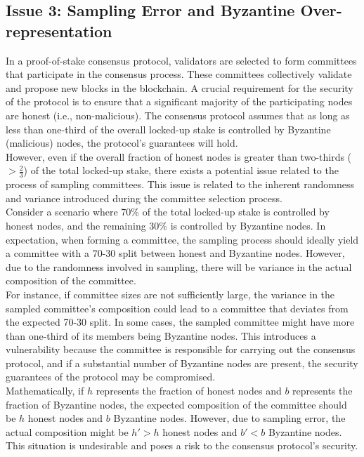 \subsection{Issue 3: Sampling Error and Byzantine Over-representation}
In a proof-of-stake consensus protocol, validators are selected to form committees that participate in the consensus process. These committees collectively validate and propose new blocks in the blockchain. A crucial requirement for the security of the protocol is to ensure that a significant majority of the participating nodes are honest (i.e., non-malicious). The consensus protocol assumes that as long as less than one-third of the overall locked-up stake is controlled by Byzantine (malicious) nodes, the protocol's guarantees will hold.\\
However, even if the overall fraction of honest nodes is greater than two-thirds (\(>\frac{2}{3}\)) of the total locked-up stake, there exists a potential issue related to the process of sampling committees. This issue is related to the inherent randomness and variance introduced during the committee selection process.\\
Consider a scenario where 70\% of the total locked-up stake is controlled by honest nodes, and the remaining 30\% is controlled by Byzantine nodes. In expectation, when forming a committee, the sampling process should ideally yield a committee with a 70-30 split between honest and Byzantine nodes. However, due to the randomness involved in sampling, there will be variance in the actual composition of the committee.\\
For instance, if committee sizes are not sufficiently large, the variance in the sampled committee's composition could lead to a committee that deviates from the expected 70-30 split. In some cases, the sampled committee might have more than one-third of its members being Byzantine nodes. This introduces a vulnerability because the committee is responsible for carrying out the consensus protocol, and if a substantial number of Byzantine nodes are present, the security guarantees of the protocol may be compromised.\\

Mathematically, if \(h\) represents the fraction of honest nodes and \(b\) represents the fraction of Byzantine nodes, the expected composition of the committee should be \(h\) honest nodes and \(b\) Byzantine nodes. However, due to sampling error, the actual composition might be \(h' > h\) honest nodes and \(b' < b\) Byzantine nodes. This situation is undesirable and poses a risk to the consensus protocol's security.

